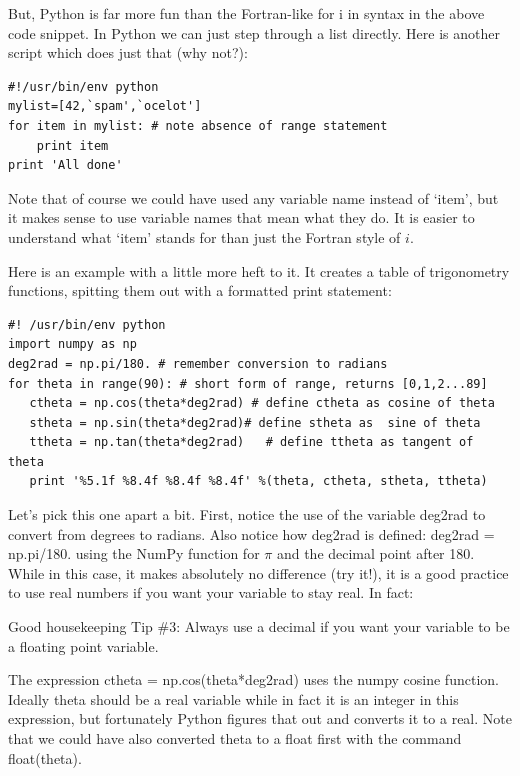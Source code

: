 \documentclass[11pt]{book}
\begin{document}
{But, Python is far more fun than the Fortran-like {\color{blue}for i in} syntax in the above code snippet.  In Python we can just step through a list directly.  Here is another  script which does just that (why not?):  

{ \color{blue} \begin{verbatim}
#!/usr/bin/env python
mylist=[42,`spam',`ocelot']
for item in mylist: # note absence of range statement
    print item
print 'All done' 
\end{verbatim}}

\noindent Note that of course we could have used any variable name instead of `item', but it makes sense to use variable names that mean what they do.  It is easier to understand what `item' stands for than just the Fortran style of $i$.  

Here is an example with a little more heft to it.  It creates a table of trigonometry functions, spitting them out with a formatted print statement:

{ \color{blue} \begin{verbatim}
#! /usr/bin/env python
import numpy as np
deg2rad = np.pi/180. # remember conversion to radians
for theta in range(90): # short form of range, returns [0,1,2...89]
   ctheta = np.cos(theta*deg2rad) # define ctheta as cosine of theta
   stheta = np.sin(theta*deg2rad)# define stheta as  sine of theta
   ttheta = np.tan(theta*deg2rad)   # define ttheta as tangent of theta
   print '%5.1f %8.4f %8.4f %8.4f' %(theta, ctheta, stheta, ttheta) 
 \end{verbatim}}
 
 Let's pick this one apart a bit.  First, 
notice the use of the variable {\color{blue}deg2rad} to convert from degrees to radians.  Also notice how deg2rad is defined: {\color{blue}deg2rad = np.pi/180.} using the {\color{blue}NumPy} function for $\pi$ and the decimal point after 180.  While in this case, it makes absolutely no difference (try it!), it is a good practice to use real numbers if you want your variable to stay real.  In fact:

{\color{magenta}Good housekeeping Tip \#3:  Always use a decimal if you want your variable to be a floating point variable.}

The expression {\color{blue} ctheta = np.cos(theta*deg2rad)} uses the {\color{blue}numpy} cosine function. Ideally {\color{blue} theta} should be a real variable while in fact it is an integer
  in this expression, but fortunately Python figures that out and converts it to a real.   Note that we could have also converted theta to a float first with the command {\color{blue}float(theta)}.  
  
}
\end{document}
